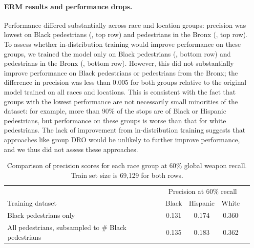 \paragraph{ERM results and performance drops.}
Performance differed substantially across race and location groups: precision was lowest on Black pedestrians (, top row) and pedestrians in the Bronx (, top row).
To assess whether in-distribution training would improve performance on these groups, we trained the model only on Black pedestrians (, bottom row) and pedestrians in the Bronx (, bottom row).
However, this did not substantially improve performance on Black pedestrians or pedestrians from the Bronx; the difference in precision was less than 0.005 for both groups relative to the original model trained on all races and locations.
This is consistent with the fact that groups with the lowest performance are not necessarily small minorities of the dataset: for example, more than 90\% of the stops are of Black or Hispanic pedestrians, but performance on these groups is worse than that for white pedestrians.
The lack of improvement from in-distribution training suggests that approaches like group DRO would be unlikely to further improve performance, and we thus did not assess these approaches.

\begin{table}[tbp]
  \caption{Comparison of precision scores for each race group at 60\% global weapon recall. Train set size is 69,129 for both rows.}
  \centering
  \begin{tabular}{lcccc}
  \toprule
  & \multicolumn{3}{c}{Precision at 60\% recall} \\
  Training dataset  &          Black & Hispanic & White          \\
  \midrule
  Black pedestrians only        & 0.131      & 0.174 & 0.360          \\
  All pedestrians, subsampled to \# Black pedestrians        & 0.135     &  0.183  & 0.362      \\
  \bottomrule
  \end{tabular}
  \label{tab:sqf_precision_by_race}
\end{table}

